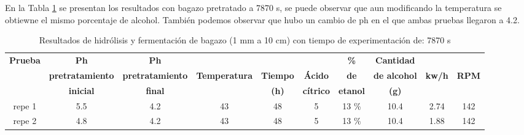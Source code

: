 \documentclass[12pt]{article}
\begin{document}
	
	

	
	
	En la Tabla \ref{hidrolisis alcalino varios 2} se presentan los resultados con bagazo pretratado a 7870 s, se puede observar que aun modificando la temperatura se obtiewne el mismo porcentaje de alcohol. También podemos observar que hubo un cambio de ph en el que ambas pruebas llegaron a 4.2.
	
	
	
		 	\begin{table}[H]
		\centering
		\caption{Resultados de hidrólisis y fermentación de bagazo (1 mm a 10 cm) con tiempo de experimentación de: 7870 s}
		\label{hidrolisis alcalino varios 2}
		\resizebox{\linewidth}{!} {
			\begin{tabular}{|c|c|c|c|c|c|c|c|c|c|}
				\hline
				\textbf{Prueba}	& \textbf{Ph}& \textbf{Ph} &  &  &  &\textbf{\%} & \textbf{Cantidad} & &\\
				&	\textbf{pretratamiento} & 	\textbf{pretratamiento} & \textbf{Temperatura} & \textbf{Tiempo} & \textbf{Ácido} & \textbf{de } & \textbf{de alcohol } & \textbf{kw/h}& \textbf{RPM}\\
				&	\textbf{inicial}& \textbf{final} &  &\textbf{(h)}  & \textbf{cítrico} & \textbf{etanol }& \textbf{(g) }&& \\ \hline		

				repe 1	&5.5& 4.2 & 43& 48 & 5 & 13 \% &10.4 & 2.74& 142 \\ \hline

				repe 2	&4.8& 4.2 & 43& 48 & 5 & 13 \%  &10.4& 1.88&142 \\ \hline

				
		\end{tabular} }
		
	\end{table}
	
	
	
\end{document}
